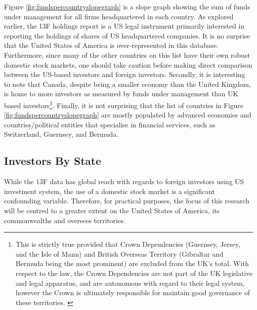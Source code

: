 Figure \ref{fig:fundspercountryslopegraph} is a slope graph showing the sum of funds under management for all firms headquartered in each country.  As explored earlier, the 13F holdings report is a US legal instrument primarily interested in reporting the holdings of shares of US headquartered companies. It is no surprise that the United States of America is over-represented in this database.  Furthermore, since many of the other countries on this list have their own robust domestic stock markets, one should take caution before making direct comparison between the US-based investors and foreign investors.  Secondly, it is interesting to note that Canada, despite being a smaller economy than the United Kingdom, is home to more investors as measured by funds under management than UK based investors\footnote{This is strictly true provided that Crown Dependencies (Guernsey, Jersey, and the Isle of Mann) and British Overseas Territory (Gibraltar and Bermuda being the most prominent) are excluded from the UK's total.  With respect to the law, the Crown Dependencies are not part of the UK legislative and legal apparatus, and are autonomous with regard to their legal system, however the Crown is ultimately responsible for maintain good governance of these territories.  \citep{CrownDependencies}}. Finally, it is not surprising that the list of countries in Figure \ref{fig:fundspercountryslopegraph} are mostly populated by advanced economies and countries/political entities that specialise in financial services, such as Switzerland, Guernsey, and Bermuda.



\subsection{Investors By State}

While the 13F data has global reach with regards to foreign investors using US investment system, the use of a domestic stock market is a significant confounding variable.  Therefore, for practical purposes, the focus of this research will be centred to a greater extent on the United States of America, its commonwealths and oversees territories.

